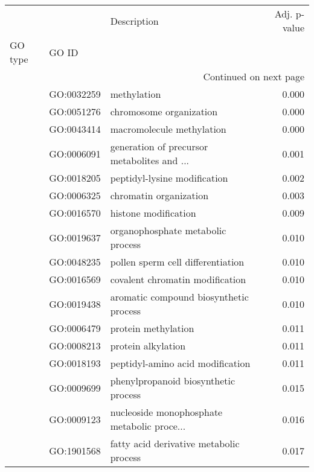 \begin{longtable}{lllr}
\toprule
   &            &                                  Description &  Adj. p-value \\
GO type & GO ID &                                              &               \\
\midrule
\endhead
\midrule
\multicolumn{4}{r}{{Continued on next page}} \\
\midrule
\endfoot

\bottomrule
\endlastfoot
\multirow{56}{*}{BP} & GO:0032259 &                                  methylation &         0.000 \\
   & GO:0051276 &                      chromosome organization &         0.000 \\
   & GO:0043414 &                    macromolecule methylation &         0.000 \\
   & GO:0006091 &  generation of precursor metabolites and ... &         0.001 \\
   & GO:0018205 &                 peptidyl-lysine modification &         0.002 \\
   & GO:0006325 &                       chromatin organization &         0.003 \\
   & GO:0016570 &                         histone modification &         0.009 \\
   & GO:0019637 &            organophosphate metabolic process &         0.010 \\
   & GO:0048235 &            pollen sperm cell differentiation &         0.010 \\
   & GO:0016569 &              covalent chromatin modification &         0.010 \\
   & GO:0019438 &       aromatic compound biosynthetic process &         0.010 \\
   & GO:0006479 &                          protein methylation &         0.011 \\
   & GO:0008213 &                           protein alkylation &         0.011 \\
   & GO:0018193 &             peptidyl-amino acid modification &         0.011 \\
   & GO:0009699 &         phenylpropanoid biosynthetic process &         0.015 \\
   & GO:0009123 &  nucleoside monophosphate metabolic proce... &         0.016 \\
   & GO:1901568 &      fatty acid derivative metabolic process &         0.017 \\

\end{longtable}
